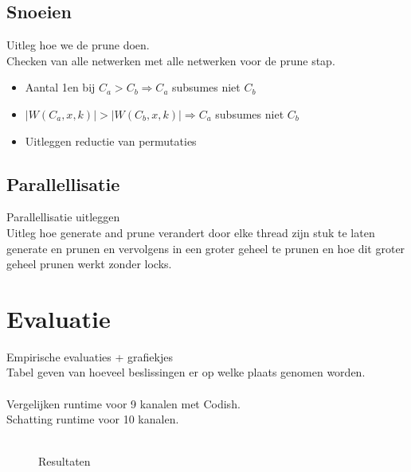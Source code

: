\documentclass{article}
\begin{document}
\subsection{Snoeien}
Uitleg hoe we de prune doen.\\
Checken  van alle netwerken met alle netwerken voor de prune stap.
\begin{itemize}
\item Aantal 1en bij $C_a > C_b \Rightarrow C_a$ subsumes niet $C_b$ 
\item $|W(C_a, x, k)| > |W(C_b, x, k)| \Rightarrow C_a$ subsumes niet $C_b$
\item Uitleggen reductie van permutaties
\end{itemize}

\subsection{Parallellisatie}
Parallellisatie uitleggen\\
Uitleg hoe generate and prune verandert door elke thread zijn stuk te laten generate en prunen en vervolgens in een groter geheel te prunen en hoe dit groter geheel prunen werkt zonder locks.


\section{Evaluatie}
Empirische evaluaties + grafiekjes\\
Tabel geven van hoeveel beslissingen er op welke plaats genomen worden.\\ \\
Vergelijken runtime voor 9 kanalen met Codish.\\
Schatting runtime voor 10 kanalen.\\\\

\begin{figure}[!h]
\centering
{}
\caption{Resultaten}
\end{figure}
\end{document}
